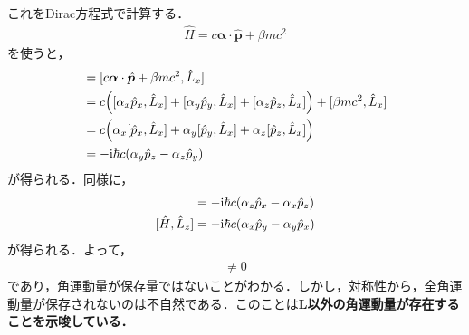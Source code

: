 \documentclass{report}
\begin{document}
これをDirac方程式で計算する．
\begin{align}
  \hat{H} = c \bm{\alpha} \cdot \hat{\bm{p}} + \beta mc^2
\end{align}
を使うと，
\begin{align}
  [\hat{H}, \hat{L}_x] &= [c \bm{\alpha} \cdot \hat{\bm{p}} + \beta mc^2, \hat{L}_x]\\
  &= c\qty([\alpha_x \hat{p}_x, \hat{L}_x] + [\alpha_y \hat{p}_y, \hat{L}_x] + [\alpha_z \hat{p}_z, \hat{L}_x]) + [\beta mc^2, \hat{L}_x]\\
  &= c\qty(\alpha_x[\hat{p}_x, \hat{L}_x] + \alpha_y[\hat{p}_y, \hat{L}_x] + \alpha_z[\hat{p}_z, \hat{L}_x])\\
  &= -\i\hbar c (\alpha_y \hat{p}_z - \alpha_z \hat{p}_y)
\end{align}
が得られる．同様に，
\begin{align}
  [\hat{H}, \hat{L}_y] &= -\i\hbar c (\alpha_z \hat{p}_x - \alpha_x \hat{p}_z)\\
  [\hat{H}, \hat{L}_z] &= -\i\hbar c (\alpha_x \hat{p}_y - \alpha_y \hat{p}_x)
\end{align}
が得られる．よって，
\begin{align}
  [\hat{H}, \hat{\bm{L}}] \neq 0
\end{align}
であり，角運動量が保存量ではないことがわかる．しかし，対称性から，全角運動量が保存されないのは不自然である．このことは\textbf{$\bm{L}$以外の角運動量が存在することを示唆している．}
\end{document}
